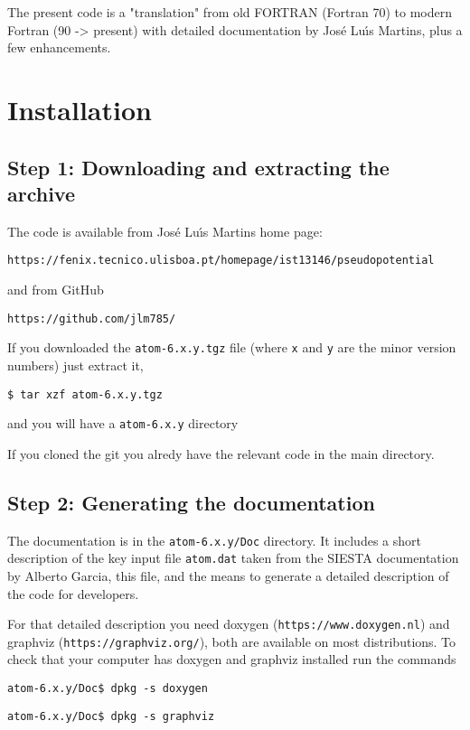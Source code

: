 \documentclass[11pt]{article}
\begin{document}
The present code is a "translation" from old FORTRAN (Fortran 70) to modern Fortran (90 -> present)
with detailed documentation by Jos\'e Lu\'{\i}s Martins, plus a few enhancements.

\section{Installation}
\label{sec:install}

\subsection{Step 1: Downloading and extracting the archive}
\label{sec:step1}

The code is available from Jos\'e Lu\'{\i}s Martins home page:

\noindent\texttt{https://fenix.tecnico.ulisboa.pt/homepage/ist13146/pseudopotential}

and from GitHub

\noindent\texttt{https://github.com/jlm785/}

If you downloaded the \texttt{atom-6.x.y.tgz} file (where \texttt{x} and \texttt{y}
are the minor version numbers) just extract it,

\noindent\texttt{\$ tar xzf atom-6.x.y.tgz}

and you will have a \texttt{atom-6.x.y} directory

If you cloned the git you alredy have the relevant code in the main directory.

\subsection{Step 2: Generating the documentation}
\label{sec:step2}

The documentation is in the \texttt{atom-6.x.y/Doc} directory.  It includes a short description of the key input file
\texttt{atom.dat} taken from the SIESTA documentation by Alberto Garcia, this file, and the means to generate a detailed
description of the code for developers.

For that detailed description you need doxygen (\texttt{https://www.doxygen.nl}) and 
graphviz (\texttt{https://graphviz.org/}), both are
available on most distributions.  To check that your computer has doxygen and graphviz installed
run the commands

\noindent\texttt{atom-6.x.y/Doc\$ dpkg -s doxygen}

\noindent\texttt{atom-6.x.y/Doc\$ dpkg -s graphviz}
\end{document}
